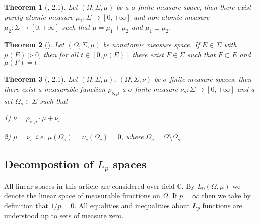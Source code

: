 \documentclass[12pt]{article}
\newtheorem{theorem}{Theorem}[subsection]
\begin{document}
\begin{theorem}[\cite{RoyJAtNonAtMeas}, 2.1]\label{MeasSpDecomp} Let $(\Omega,\Sigma,\mu)$ be a $\sigma$-finite measure space, then there exist purely atomic measure $\mu_1:\Sigma\to[0,+\infty]$ and non atomic measure $\mu_2:\Sigma\to[0,+\infty]$ such that $\mu=\mu_1+\mu_2$ and $\mu_1\perp\mu_2$.
\end{theorem}

\begin{theorem}[\cite{SierpConFamlFunc}]\label{ContOfNonAtmMeas} Let $(\Omega,\Sigma,\mu)$ be nonatomic measure space. If $E\in\Sigma$  with $\mu(E)>0$, then for all $t\in[0,\mu(E)]$ there exist $F\in\Sigma$ such that $F\subset E$ and $\mu(F)=t$
\end{theorem}

\begin{theorem}[\cite{RoyJLebDecompTh}, 2.1]\label{LebMeasDecomp} Let $(\Omega,\Sigma,\mu)$, $(\Omega,\Sigma,\nu)$ be $\sigma$-finite measure spaces, then there exist a measurable function $\rho_{\nu,\mu}$ a $\sigma$-finite measure $\nu_s:\Sigma\to[0,+\infty]$ and a set $\Omega_s\in\Sigma$ such that

1) $\nu=\rho_{\nu,\mu}\cdot\mu+\nu_s$

2) $\mu\perp\nu_s$ i.e.  $\mu(\Omega_s)=\nu_s(\Omega_c)=0$, where $\Omega_c=\Omega\setminus\Omega_s$
\end{theorem}


































\subsection{Decompostion of \texorpdfstring{$L_p$}{Lp} spaces}

All linear spaces in this article are considered over field $\mathbb{C}$. By $L_0(\Omega,\mu)$ we denote the linear space of measurable functions on $\Omega$. If $p=\infty$ then we take by definition that $1/p=0$. All equalities and inequalities about $L_p$ functions are understood up to sets of measure zero.
\end{document}
